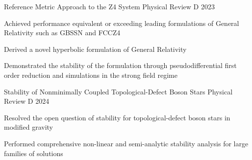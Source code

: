 \begin{cventries}
    \cventrythree
    {Reference Metric Approach to the Z4 System} %
    {} %
    {Physical Review D} %
    {2023} %
    {\begin{cvitems} %
        \item Achieved performance equivalent or exceeding leading formulations of General Relativity such as GBSSN and FCCZ4
        \item Derived a novel hyperbolic formulation of General Relativity
        \item Demonstrated the stability of the formulation through pseudodifferential first order reduction and simulations in the strong field regime
    \end{cvitems}}
    
    \cventrythree
    {Stability of Nonminimally Coupled Topological-Defect Boson Stars} %
    {} %
    {Physical Review D} %
    {2024} %
    {\begin{cvitems} %
        \item Resolved the open question of stability for topological-defect boson stars in modified gravity
        \item Performed comprehensive non-linear and semi-analytic stability analysis for large families of solutions
    \end{cvitems}}
    

\end{cventries}